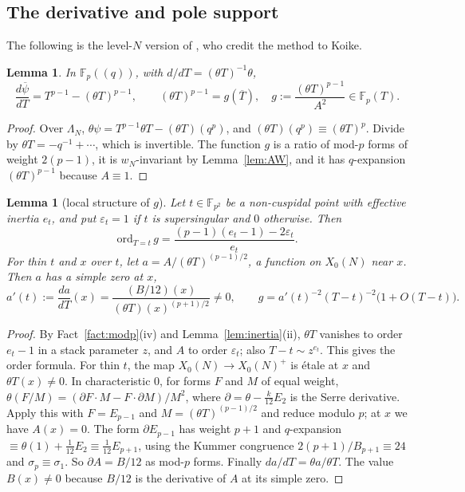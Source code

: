 \documentclass[11pt,a4paper]{article}
\numberwithin{equation}{section}
\newtheorem{lemma}[theorem]{Lemma}
\theoremstyle{definition}
\theoremstyle{remark}
\newcommand{\Fp}{\mathbb F_p}
\newcommand{\Fq}{\mathbb F_{p^2}}
\begin{document}
\subsection{The derivative and pole support}

The following is the level-$N$ version of \citet[\S10, (35)--(38)]{KZ98}, who credit the method to Koike.

\begin{lemma}\label{lem:dpsi}
In $\Fp((q))$, with $d/dT=(\theta T)^{-1}\theta$,
\[
\frac{d\overline\psi}{dT}=T^{p-1}-(\theta T)^{p-1},\qquad (\theta T)^{p-1}=g(\overline T),\quad
g:=\frac{(\theta T)^{p-1}}{A^2}\in\Fp(T).
\]
\end{lemma}
\begin{proof}
Over $\Lambda_N$, $\theta\psi=T^{p-1}\theta T-(\theta T)(q^p)$, and $(\theta T)(q^p)\equiv(\theta T)^p$.
Divide by $\theta T=-q^{-1}+\cdots$, which is invertible. The function $g$ is a ratio of mod-$p$
forms of weight $2(p-1)$, it is $w_N$-invariant by Lemma~\ref{lem:AW}, and it has $q$-expansion
$(\theta T)^{p-1}$ because $A\equiv1$.
\end{proof}

\begin{lemma}[local structure of $g$]\label{lem:g}
Let $t\in\Fq$ be a non-cuspidal point with effective inertia $e_t$, and put $\varepsilon_t=1$ if
$t$ is supersingular and $0$ otherwise. Then
\[
\mathrm{ord}_{T=t}\,g=\frac{(p-1)(e_t-1)-2\varepsilon_t}{e_t}.
\]
For thin $t$ and $x$ over $t$, let $a=A/(\theta T)^{(p-1)/2}$, a function on $X_0(N)$ near $x$.
Then $a$ has a simple zero at $x$,
\[
a'(t):=\frac{da}{dT}(x)=\frac{(B/12)(x)}{(\theta T)(x)^{(p+1)/2}}\ne0,
\qquad g=a'(t)^{-2}(T-t)^{-2}\bigl(1+O(T-t)\bigr).
\]
\end{lemma}
\begin{proof}
By Fact~\ref{fact:modp}(iv) and Lemma~\ref{lem:inertia}(ii), $\theta T$ vanishes to order $e_t-1$ in a
stack parameter $z$, and $A$ to order $\varepsilon_t$; also $T-t\sim z^{e_t}$. This gives the order formula.
For thin $t$, the map $X_0(N)\to X_0(N)^+$ is \'etale at $x$ and $\theta T(x)\ne0$. In
characteristic $0$, for forms $F$ and $M$ of equal weight,
$\theta(F/M)=(\partial F\cdot M-F\cdot\partial M)/M^2$, where $\partial=\theta-\frac{k}{12}E_2$ is the
Serre derivative. Apply this with $F=E_{p-1}$ and $M=(\theta T)^{(p-1)/2}$ and reduce modulo $p$; at
$x$ we have $A(x)=0$. The form $\partial E_{p-1}$ has weight $p+1$ and $q$-expansion
$\equiv\theta(1)+\frac1{12}E_2\equiv\frac1{12}E_{p+1}$, using the Kummer congruence
$2(p+1)/B_{p+1}\equiv24$ and $\sigma_p\equiv\sigma_1$. So $\partial A=B/12$ as mod-$p$ forms. Finally
$da/dT=\theta a/\theta T$. The value $B(x)\ne0$ because $B/12$ is the derivative of $A$ at its simple zero.
\end{proof}
\end{document}
